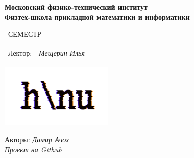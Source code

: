 \begin{titlepage}
	\clearpage\thispagestyle{empty}
	\centering
	
	\textbf{Московский физико-технический институт \\ Физтех-школа прикладной математики и информатики}
	\vspace{33ex}
	
	{\textbf{\FullCourseNameFirstPart}}
	
	\SemesterNumber\ СЕМЕСТР  
	\vspace{1ex}
	\begin{center}
		\begin{tabular}{rr}
			Лектор:\!\!\!\!& \textit{Мещерин Илья}
		\end{tabular}
	\end{center}
	
	\includegraphics[width=0.4\textwidth]{images/logo_ltc.png}

	\begin{flushright}
		\noindent
		Авторы: \href{https://vk.com/kchaugi}{\textit{Дамир Ачох}}
		\\
		\href{\GithubLink}{\textit{Проект на Github}}
	\end{flushright}
	
	\vfill
	\CourseDate
	\pagebreak
\end{titlepage}
